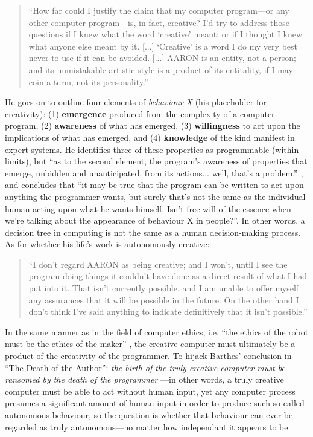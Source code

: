 \begin{leftbar}
\begin{quotation}
  ``How far could I justify the claim that my computer program---or any other computer program---is, in fact, creative? I'd try to address those questions if I knew what the word `creative' meant: or if I thought I knew what anyone else meant by it. [...] `Creative' is a word I do my very best never to use if it can be avoided. [...] AARON is an entity, not a person; and its unmistakable artistic style is a product of its entitality, if I may coin a term, not its personality.'' \autocite{Cohen1999}
\end{quotation}

He goes on to outline four elements of \textit{behaviour X} (his placeholder for creativity): (1) \textbf{emergence} produced from the complexity of a computer program, (2) \textbf{awareness} of what has emerged, (3) \textbf{willingness} to act upon the implications of what has emerged, and (4) \textbf{knowledge} of the kind manifest in expert systems. He identifies three of these properties as programmable (within limits), but ``as to the second element, the program's awareness of properties that emerge, unbidden and unanticipated, from its actions...  well, that's a problem.'' \autocite{Cohen1999}, and concludes that ``it may be true that the program can be written to act upon anything the programmer wants, but surely that's not the same as the individual human acting upon what he wants himself. Isn't free will of the essence when we're talking about the appearance of behaviour X in people?''. In other words, a decision tree in computing is not the same as a human decision-making process. As for whether his life's work is autonomously creative:

\begin{quotation}
  ``I don't regard AARON as being creative; and I won't, until I see the program doing things it couldn't have done as a direct result of what I had put into it. That isn't currently possible, and I am unable to offer myself any assurances that it will be possible in the future. On the other hand I don't think I've said anything to indicate definitively that it isn't possible.'' \autocite{Cohen1999}
\end{quotation}

In the same manner as in the field of computer ethics, i.e. ``the ethics of the robot must be the ethics of the maker'' \autocite{Mcbride2012}, the creative computer must ultimately be a product of the creativity of the programmer. To hijack Barthes' conclusion in ``The Death of the Author'': \textit{the birth of the truly creative computer must be ransomed by the death of the programmer} \autocite{Barthes1967}---in other words, a truly creative computer must be able to act without human input, yet any computer process presumes a significant amount of human input in order to produce such so-called autonomous behaviour, so the question is whether that behaviour can ever be regarded as truly autonomous---no matter how independant it appears to be.


\end{leftbar}
